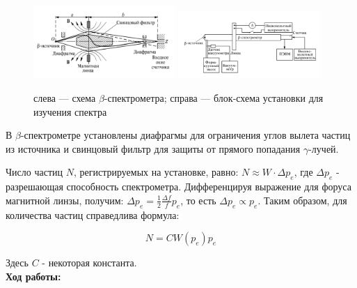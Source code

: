 \documentclass[a4paper, 12pt]{article}%
\begin{document}
	\begin{figure}[h]
		\centering
		\includegraphics[width=0.48\textwidth]{lab}
		\hfill
		\includegraphics[width=0.48\textwidth]{lab2}
		\caption{слева --- схема $\beta$-спектрометра; справа --- блок-схема установки для изучения спектра}
		\label{pic:scheme}
	\end{figure}
	
	В $\beta$-спектрометре установлены диафрагмы для ограничения углов вылета частиц из источника и свинцовый фильтр для защиты от прямого попадания $\gamma$-лучей. 
	
	Число частиц $N$, регистрируемых на установке, равно: $N \approx W \cdot \Delta p_e$, где $\Delta p_e$ - разрешающая способность спектрометра. Дифференцируя выражение для форуса магнитной линзы, получим: $\Delta p_e = \frac{1}{2}\frac{\Delta f}{f}p_e$, то есть $\Delta p_e \propto p_e$. Таким образом, для количества частиц справедлива формула: 
	
	\begin{equation}\label{N}
		N = CW(p_e)p_e 
	\end{equation}
	
	Здесь $C$ - некоторая константа.\\
	
	
	\textbf{Ход работы: }\\
	
\end{document}
